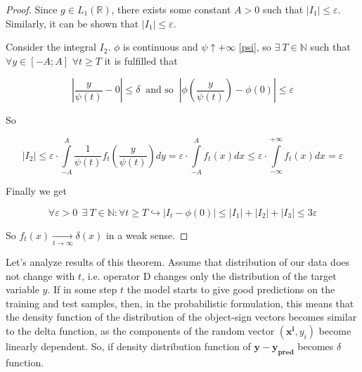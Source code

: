 \documentclass{article}
\begin{document}
\begin{proof}
        Since $g \in L_1(\mathbb{R})$, there exists some constant $A > 0$ such that $\left|I_1\right| \leq \varepsilon$. Similarly, it can be shown that $\left|I_1\right| \leq \varepsilon$.

        Consider the integral $I_2$. $\phi$ is continuous and $\psi \uparrow +\infty$ \eqref{psi}, so $\exists~ T \in \mathbb{N}$ such that $\forall y \in [-A; A]$ $\forall t \geq T$ it is fulfilled that 

        \begin{equation*}
            \left|\frac{y}{\psi(t)} - 0\right| \leq \delta ~\text{ and so }~ \left|\phi\left(\frac{y}{\psi(t)}\right) - \phi(0)\right| \leq \varepsilon
        \end{equation*}

        So

        \begin{equation*}
            \left|I_2\right| \leq \varepsilon \cdot \int\limits_{-A}^{A} \dfrac{1}{\psi(t)} f_t\left(\frac{y}{\psi(t)}\right) dy = 
            \varepsilon \cdot \int\limits_{-A}^{A} f_t\left(x\right) dx \leq \varepsilon \cdot \int\limits_{-\infty}^{+\infty} f_t\left(x\right) dx = \varepsilon
        \end{equation*}

        Finally we get

        \begin{equation*}
            \forall \varepsilon > 0 ~~ \exists~ T \in \mathbb{N} : \forall t \geq T \hookrightarrow \left|I_t - \phi(0)\right| \leq 
            \left|I_1\right| + \left|I_2\right| + \left|I_3\right| \leq 3\varepsilon
        \end{equation*}

        So $f_t(x) \underset{t \to \infty}{\longrightarrow} \delta(x)$ in a weak sense.

    \end{proof}

    Let's analyze results of this theorem. Assume that distribution of our data does not change with $t$, i.e. operator $\text{D}$ changes only the distribution of the target variable $y$. If in some step $t$ the model starts to give good predictions on the training and test samples, then, in the probabilistic formulation, this means that the density function of the distribution of the object-sign vectors becomes similar to the delta function, as the components of the random vector $(\mathbf{x^i}, y_i)$ become linearly dependent. So, if density distribution function of $\mathbf{y} - \mathbf{y_{\text{pred}}}$ becomes $\delta$ function.
\end{document}
